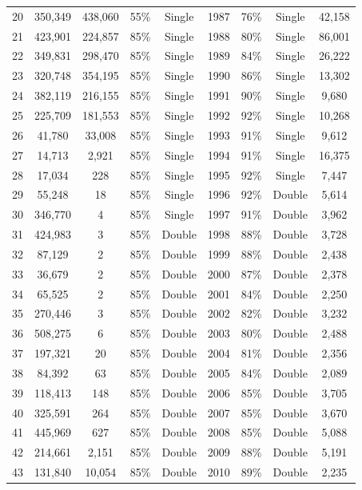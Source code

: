 \documentclass[a4paper,11pt] {scrartcl}
\begin{document}
\begin{table}[hp]
\begin{tabular}{c c c c c | c c c c}
20 & 350,349 & 438,060 & 55\% & Single & 1987 & 76\% & Single & 42,158\\ 
21 & 423,901 & 224,857 & 85\% & Single & 1988 & 80\% & Single & 86,001\\ 
22 & 349,831 & 298,470 & 85\% & Single & 1989 & 84\% & Single & 26,222\\ 
23 & 320,748 & 354,195 & 85\% & Single & 1990 & 86\% & Single & 13,302\\ 
24 & 382,119 & 216,155 & 85\% & Single & 1991 & 90\% & Single & 9,680\\ 
25 & 225,709 & 181,553 & 85\% & Single & 1992 & 92\% & Single & 10,268\\ 
26 & 41,780 & 33,008 & 85\% & Single & 1993 & 91\% & Single & 9,612\\ 
27 & 14,713 & 2,921 & 85\% & Single & 1994 & 91\% & Single & 16,375\\ 
28 & 17,034 & 228 & 85\% & Single & 1995 & 92\% & Single & 7,447\\ 
29 & 55,248 & 18 & 85\% & Single & 1996 & 92\% & Double & 5,614\\ 
30 & 346,770 & 4 & 85\% & Single & 1997 & 91\% & Double & 3,962\\ 
31 & 424,983 & 3 & 85\% & Double & 1998 & 88\% & Double & 3,728\\ 
32 & 87,129 & 2 & 85\% & Double & 1999 & 88\% & Double & 2,438\\ 
33 & 36,679 & 2 & 85\% & Double & 2000 & 87\% & Double & 2,378\\ 
34 & 65,525 & 2 & 85\% & Double & 2001 & 84\% & Double & 2,250\\ 
35 & 270,446 & 3 & 85\% & Double & 2002 & 82\% & Double & 3,232\\ 
36 & 508,275 & 6 & 85\% & Double & 2003 & 80\% & Double & 2,488\\ 
37 & 197,321 & 20 & 85\% & Double & 2004 & 81\% & Double & 2,356\\ 
38 & 84,392 & 63 & 85\% & Double & 2005 & 84\% & Double & 2,089\\ 
39 & 118,413 & 148 & 85\% & Double & 2006 & 85\% & Double & 3,705\\ 
40 & 325,591 & 264 & 85\% & Double & 2007 & 85\% & Double & 3,670\\ 
41 & 445,969 & 627 & 85\% & Double & 2008 & 85\% & Double & 5,088\\ 
42 & 214,661 & 2,151 & 85\% & Double & 2009 & 88\% & Double & 5,191\\ 
43 & 131,840 & 10,054 & 85\% & Double & 2010 & 89\% & Double & 2,235\\ 

\end{tabular}
\end{table}
\end{document}
